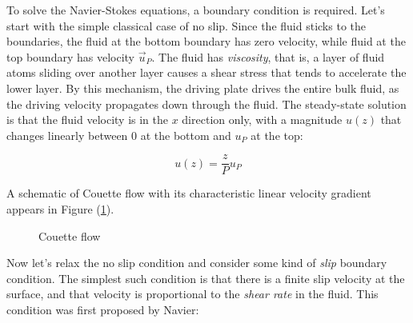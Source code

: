 \documentclass[12pt, a4paper, twoside, openright]{book}
\begin{document}
To solve the Navier-Stokes equations, a boundary condition is required. Let's start with the simple classical case of no slip. Since the fluid sticks to the boundaries, the fluid at the bottom boundary has zero velocity, while fluid at the top boundary has velocity $\vec{u}_{P}$. 
The fluid has \emph{viscosity}, that is, a layer of fluid atoms sliding over another layer causes a shear stress that tends to accelerate the lower layer.  By this mechanism, the driving plate drives the entire bulk fluid, as the driving velocity propagates down through the fluid.
The steady-state solution is that the fluid velocity is in the $x$ direction only, with a magnitude $u(z)$ that changes linearly between 0 at the bottom and $u_{P}$ at the top:

\begin{equation}
u(z) = \frac{z}{P}u_{P}  
\end{equation}

A schematic of Couette flow with its characteristic linear velocity gradient appears in Figure (\ref{Couetteflow}).

\begin{figure}[ht]
\centering
{}
\caption{Couette flow} \label{Couetteflow}
\end{figure}

Now let's relax the no slip condition and consider some kind of \emph{slip} boundary condition. The simplest such condition is that there is a finite slip velocity at the surface, and that velocity is proportional to the \emph{shear rate} in the fluid. This condition was first proposed by Navier:
\end{document}
